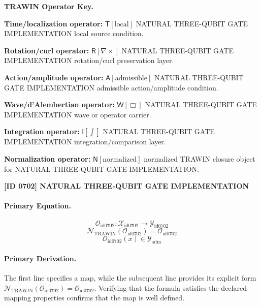 \par\vspace{0.45\baselineskip}
\noindent\begin{minipage}[t]{\linewidth}
\begingroup
\small
\raggedright
\textbf{TRAWIN Operator Key.}\par
\noindent\textbf{Time/localization operator:} $\mathsf{T}\!\left[\mathrm{local}\right]$ NATURAL THREE-QUBIT GATE IMPLEMENTATION local source condition.\par
\noindent\textbf{Rotation/curl operator:} $\mathsf{R}\!\left[\nabla\times\right]$ NATURAL THREE-QUBIT GATE IMPLEMENTATION rotation/curl preservation layer.\par
\noindent\textbf{Action/amplitude operator:} $\mathsf{A}\!\left[\mathrm{admissible}\right]$ NATURAL THREE-QUBIT GATE IMPLEMENTATION admissible action/amplitude condition.\par
\noindent\textbf{Wave/d'Alembertian operator:} $\mathsf{W}\!\left[\Box\right]$ NATURAL THREE-QUBIT GATE IMPLEMENTATION wave or operator carrier.\par
\noindent\textbf{Integration operator:} $\mathsf{I}\!\left[\int\right]$ NATURAL THREE-QUBIT GATE IMPLEMENTATION integration/comparison layer.\par
\noindent\textbf{Normalization operator:} $\mathsf{N}\!\left[\mathrm{normalized}\right]$ normalized TRAWIN closure object for NATURAL THREE-QUBIT GATE IMPLEMENTATION.\par
\endgroup
\end{minipage}

\clearpage
\noindent\textbf{[ID 0702] NATURAL THREE-QUBIT GATE IMPLEMENTATION}\par
\vspace{0.35em}
\paragraph{Primary Equation.}
\[
\mathcal{O}_{\mathrm{id0702}}:\mathcal{X}_{\mathrm{id0702}}\longrightarrow\mathcal{Y}_{\mathrm{id0702}}
\]
\[
\mathcal{N}_{\mathrm{TRAWIN}}(\mathcal{O}_{\mathrm{id0702}})=\mathcal{O}_{\mathrm{id0702}}
\]
\[
\mathcal{O}_{\mathrm{id0702}}(x)\in\mathcal{Y}_{\mathrm{adm}}
\]

\paragraph{Primary Derivation.}
The first line specifies a map, while the subsequent line provides its explicit form \( \mathcal{N}_{\mathrm{TRAWIN}}(\mathcal{O}_{\mathrm{id0702}})=\mathcal{O}_{\mathrm{id0702}} \). Verifying that the formula satisfies the declared mapping properties confirms that the map is well defined.
